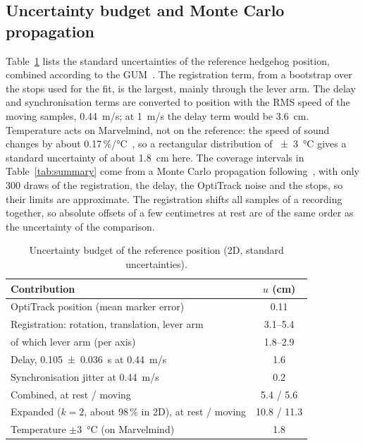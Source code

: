 \documentclass[conference]{IEEEtran}
\begin{document}
\subsection{Uncertainty budget and Monte Carlo propagation}\label{sec:budget}
Table~\ref{tab:budget} lists the standard uncertainties of the reference hedgehog position, combined
according to the GUM~\cite{gum2008}. The registration term, from a bootstrap over the stops used for the fit, is the largest, mainly through the
lever arm. The delay and synchronisation terms are converted to position with the RMS speed of the
moving samples, \SI{0.44}{m/s}; at \SI{1}{m/s} the delay term would be \SI{3.6}{cm}. Temperature acts on
Marvelmind, not on the reference: the speed of sound changes by about
0.17\,\%/\si{\celsius}~\cite{cramer1993variation}, so a rectangular distribution of \SI{\pm 3}{\celsius} gives a standard uncertainty of about \SI{1.8}{cm} here. The coverage intervals in
Table~\ref{tab:summary} come from a Monte Carlo propagation following~\cite{jcgm101}, with only 300 draws of the
registration, the delay, the OptiTrack noise and the stops, so their limits are approximate. The registration shifts all samples of a
recording together, so absolute offsets of a
few centimetres at rest are of the same order as the uncertainty of the comparison.

\begin{table}[t]
  \centering
  \caption{Uncertainty budget of the reference position (2D, standard uncertainties).}
  \label{tab:budget}
  \setlength{\tabcolsep}{4pt}
  \begin{tabular}{lc}
    \toprule
    Contribution & $u$ (cm) \\
    \midrule
    OptiTrack position (mean marker error)            & 0.11 \\
    Registration: rotation, translation, lever arm    & 3.1--5.4 \\
    \quad of which lever arm (per axis)               & 1.8--2.9 \\
    Delay, \SI{0.105 +- 0.036}{s} at \SI{0.44}{m/s}  & 1.6 \\
    Synchronisation jitter at \SI{0.44}{m/s}          & 0.2 \\
    \midrule
    Combined, at rest / moving                        & 5.4 / 5.6 \\
    Expanded ($k=2$, about 98\,\% in 2D), at rest / moving& 10.8 / 11.3 \\
    \midrule
    Temperature $\pm$\SI{3}{\celsius} (on Marvelmind) & 1.8 \\
    \bottomrule
  \end{tabular}
\end{table}
\end{document}
